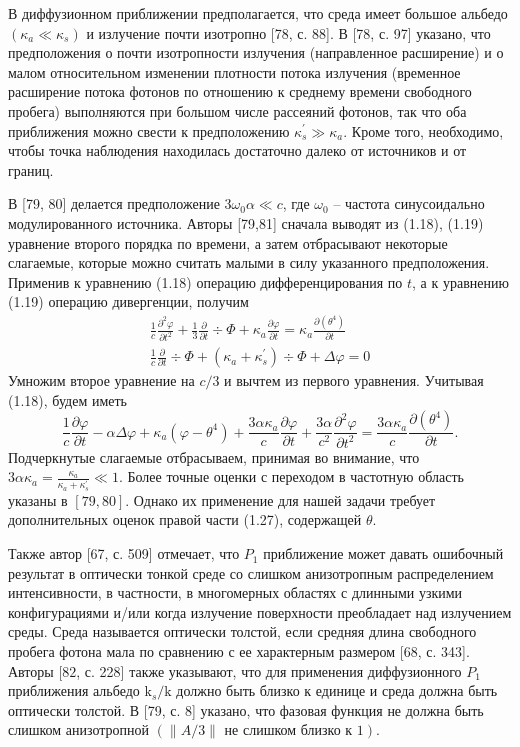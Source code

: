 В диффузионном приближении предполагается, что среда имеет большое альбедо $\left(\kappa_{a} \ll \kappa_{s}\right)$ и
излучение почти изотропно [78, с. 88].
В [78, с. 97] указано, что предположения о почти изотропности излучения
(направленное расширение) и о малом относительном изменении плотности потока излучения (временное расширение потока
фотонов по отношению к среднему времени свободного пробега) выполняются при большом числе рассеяний фотонов,
так что оба приближения можно свести к предположению $\kappa_{s}^{\prime} \gg \kappa_{a}$.
Кроме того, необходимо, чтобы точка наблюдения находилась достаточно далеко от источников и от границ.

В [79, 80] делается предположение $3 \omega_{0} \alpha \ll c$, где $\omega_{0}$ --
частота синусоидально модулированного источника.
Авторы [79,81] сначала выводят из (1.18), (1.19) уравнение второго порядка по времени,
а затем отбрасывают некоторые слагаемые, которые можно считать малыми в силу указанного предположения.
Применив к уравнению (1.18) операцию дифференцирования по $t$, а к уравнению (1.19) операцию дивергенции, получим
\[
    \begin{gathered}
        \frac{1}{c} \frac{\partial^{2} \varphi}{\partial t^{2}}+\frac{1}{3}
        \frac{\partial}{\partial t} \div \Phi+\kappa_{a} \frac{\partial \varphi}{\partial t}=\kappa_{a}
        \frac{\partial\left(\theta^{4}\right)}{\partial t} \\
        \frac{1}{c} \frac{\partial}{\partial t} \div
        \Phi+\left(\kappa_{a}+\kappa_{s}^{\prime}\right) \div \Phi+\Delta \varphi=0
    \end{gathered}
\]
Умножим второе уравнение на $c/3$ и вычтем из первого уравнения.
Учитывая (1.18), будем иметь
\[
    \frac{1}{c} \frac{\partial \varphi}{\partial t}-\alpha \Delta
    \varphi+\kappa_{a}\left(\varphi-\theta^{4}\right)+\frac{3 \alpha \kappa_{a}}{c}
    \frac{\partial \varphi}{\partial t}+\frac{3 \alpha}{c^{2}}
    \frac{\partial^{2} \varphi}{\partial t^{2}}=\frac{3 \alpha \kappa_{a}}{c}
    \frac{\partial\left(\theta^{4}\right)}{\partial t}.
\]
Подчеркнутые слагаемые отбрасываем, принимая во внимание,
что $3 \alpha \kappa_{a}=\frac{\kappa_{a}}{\kappa_{a}+\kappa_{s}^{\prime}} \ll 1$.
Более точные оценки с переходом в частотную область указаны в $[79,80]$.
Однако их применение для нашей задачи требует дополнительных оценок правой части (1.27), содержащей $\theta$.


Также автор [67, с. 509] отмечает, что $P_{1}$ приближение может давать ошибочный результат
в оптически тонкой среде со слишком анизотропным распределением интенсивности, в частности,
в многомерных областях с длинными узкими конфигурациями и/или когда излучение поверхности
преобладает над излучением среды.
Среда называется оптически толстой, если средняя длина
свободного пробега фотона мала по сравнению с ее характерным размером [68, с. 343].
Авторы $[82$, с. 228] также указывают, что для применения диффузионного $P_{1}$ приближения альбедо
$\mathrm{k}_{s} / \mathrm{k}$ должно быть близко к единице и среда должна быть оптически толстой.
В [79, с. 8] указано, что фазовая функция не должна быть слишком анизотропной
$(\|A / 3\| \text{ не слишком близко к } 1)$.


